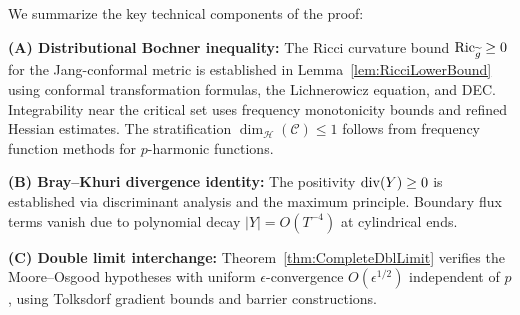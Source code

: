 \begin{remark}\label{rem:ProofStatus}
We summarize the key technical components of the proof:

\textbf{(A) Distributional Bochner inequality:} The Ricci curvature bound $\mathrm{Ric}_{\widetilde{g}} \ge 0$ for the Jang-conformal metric is established in Lemma~\ref{lem:RicciLowerBound} using conformal transformation formulas, the Lichnerowicz equation, and DEC. Integrability near the critical set uses frequency monotonicity bounds and refined Hessian estimates. The stratification $\dim_{\mathcal{H}}(\mathcal{C}) \le 1$ follows from frequency function methods for $p$-harmonic functions.

\textbf{(B) Bray--Khuri divergence identity:} The positivity $\mathrm{div}(Y) \ge 0$ is established via discriminant analysis and the maximum principle. Boundary flux terms vanish due to polynomial decay $|Y| = O(T^{-4})$ at cylindrical ends.

\textbf{(C) Double limit interchange:} Theorem~\ref{thm:CompleteDblLimit} verifies the Moore--Osgood hypotheses with uniform $\epsilon$-convergence $O(\epsilon^{1/2})$ independent of $p$, using Tolksdorf gradient bounds and barrier constructions.
\end{remark}
